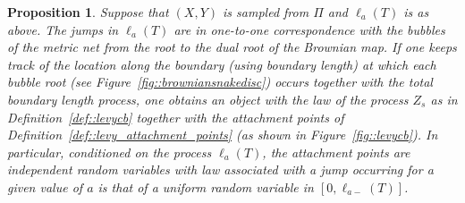 \documentclass[10pt]{amsart}
\theoremstyle{plain}
\numberwithin{theorem}{section}
\newtheorem{proposition}[theorem]{Proposition}
\theoremstyle{definition}
\let\snakeexcursionmeasure \Pi
\begin{document}
\begin{proposition}
\label{prop::jumpsoneone}
Suppose that $(X,Y)$ is sampled from $\snakeexcursionmeasure$ and $\ell_a(T)$ is as above. The jumps in $\ell_a(T)$ are in one-to-one correspondence with the bubbles of the metric net from the root to the dual root of the Brownian map. If one keeps track of the location along the boundary (using boundary length) at which each bubble root (see Figure~\ref{fig::browniansnakedisc}) occurs together with the total boundary length process, one obtains an object with the law of the process $Z_s$ as in Definition~\ref{def::levycb} together with the attachment points of Definition~\ref{def::levy_attachment_points} (as shown in Figure~\ref{fig::levycb}). In particular, conditioned on the process $\ell_a(T)$, the attachment points are independent random variables with law associated with a jump occurring for a given value of $a$ is that of a uniform random variable in $[0,\ell_{a-}(T)]$.
\end{proposition}
\end{document}
